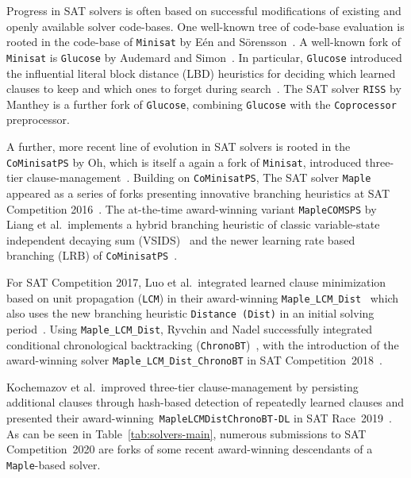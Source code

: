 \documentclass{elsarticle}
\newcommand{\solver}[1]{\texttt{#1}}
\begin{document}
Progress in SAT solvers is often based on successful modifications of existing and openly available solver code-bases. 
One well-known tree of code-base evaluation is rooted in the code-base of \solver{Minisat} by E\'en and S\"orensson~\cite{Niklas:2003:Minisat}. 
A well-known fork of \solver{Minisat} is \solver{Glucose} by Audemard and Simon~\cite{Audemard:2018:Glucose}. 
In particular, \solver{Glucose} introduced the influential literal block distance (LBD) heuristics for deciding which learned clauses to keep and which 
ones to forget during search~\cite{Audemard:2009:Glucose}. 
The SAT solver \solver{RISS} by Manthey is a further fork of \solver{Glucose}, combining \solver{Glucose}  with 
 the \solver{Coprocessor}~\cite{Manthey:2012:Coprocessor2} preprocessor. 

A further, more recent line of evolution in SAT solvers
is rooted in the \solver{CoMinisatPS} by Oh, which is itself a again a fork of \solver{Minisat}, introduced three-tier clause-management~\cite{Oh:2015:satunsat}. 
Building on \solver{CoMinisatPS}, 
The SAT solver \solver{Maple} appeared as a series of forks presenting innovative branching heuristics at SAT Competition 2016~\cite{MapleSAT}. 
The at-the-time award-winning variant \solver{MapleCOMSPS} by Liang et al.~implements a hybrid branching heuristic of classic variable-state independent decaying sum (VSIDS)~\cite{Zhang:2001:ClauseLearning} and the newer learning rate based branching (LRB) of \solver{CoMinisatPS}~\cite{Liang:2016:MapleCOMSPS}. 

For SAT Competition 2017, Luo et al.~integrated learned clause minimization based on unit propagation (\solver{LCM}) in their award-winning \solver{Maple\_LCM\_Dist}~\cite{Luo:2017:LCM} which also uses the new branching heuristic \solver{Distance (Dist)} in an initial solving period~\cite{Xiao:2017:MapleLCMDist}. 
Using \solver{Maple\_LCM\_Dist}, Ryvchin and Nadel successfully integrated conditional chronological backtracking (\solver{ChronoBT})~\cite{Nadel:2018:CBT}, with
the introduction of the award-winning solver \solver{Maple\_LCM\_Dist\_ChronoBT} in SAT Competition~2018~\cite{Ryvchin:SC2018:MapleChronoBT}. 

Kochemazov et al.~improved three-tier clause-management by persisting
additional clauses through hash-based detection of repeatedly learned clauses and presented their award-winning~\solver{MapleLCMDistChronoBT-DL} in SAT Race~2019~\cite{Kochemazov:SC2019:MapleChronoBTDL}. 
As can be seen in Table~\ref{tab:solvers-main}, numerous submissions to SAT Competition~2020 are forks of some recent award-winning descendants of a \solver{Maple}-based solver. 
\end{document}
